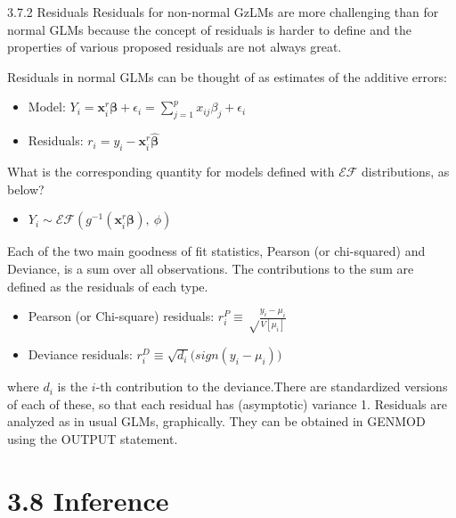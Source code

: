 \documentclass[
  9pt,
  ignorenonframetext,
]{beamer}
\providecommand{\tightlist}{%
  \setlength{\itemsep}{0pt}\setlength{\parskip}{0pt}}
\begin{document}
\begin{frame}{3.7.2 Residuals}
\protect\hypertarget{residuals}{}
Residuals for non-normal GzLMs are more challenging than for normal GLMs
because the concept of residuals is harder to define and the properties
of various proposed residuals are not always great.

Residuals in normal GLMs can be thought of as estimates of the additive
errors:

\begin{itemize}
\item
  Model:
  \(Y_i=\pmb x_i^r \pmb \beta+\epsilon_i=\sum_{j=1}^p x_{ij} \beta_j +\epsilon_i\)
\item
  Residuals: \(r_i=y_i-\pmb x_i^r \pmb {\hat \beta}\)
\end{itemize}

What is the corresponding quantity for models defined with
\(\mathcal {EF}\) distributions, as below?

\begin{itemize}
\tightlist
\item
  \(Y_i\sim \mathcal {EF}(g^{-1} (\pmb x_i^r \pmb \beta),\ \phi)\)
\end{itemize}
\end{frame}

\begin{frame}{}
\protect\hypertarget{section-8}{}
Each of the two main goodness of fit statistics, Pearson (or
chi-squared) and Deviance, is a sum over all observations. The
contributions to the sum are defined as the residuals of each type.

\begin{itemize}
\item
  Pearson (or Chi-square) residuals:
  \(r^P _i\equiv \sqrt\frac {y_i-\mu_i} {V[\mu_i]}\)
\item
  Deviance residuals:
  \(r^D _i\equiv \sqrt {d_i}\big(sign(y_i-\mu_i)\big)\)
\end{itemize}

where \(d_i\) is the \(i\)-th contribution to the deviance.There are
standardized versions of each of these, so that each residual has
(asymptotic) variance 1. Residuals are analyzed as in usual GLMs,
graphically. They can be obtained in GENMOD using the OUTPUT statement.
\end{frame}

\hypertarget{inference}{%
\section{\texorpdfstring{3.8
\textbf{Inference}}{3.8 Inference}}\label{inference}}
\end{document}
